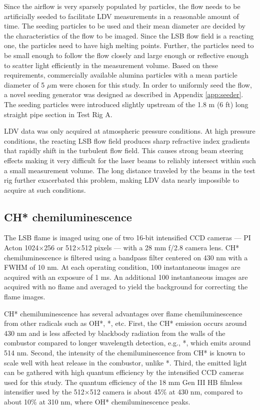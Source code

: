 Since the airflow is very sparsely populated by particles, the flow needs to be artificially seeded to facilitate LDV measurements in a reasonable amount of time.
The seeding particles to be used and their mean diameter are decided by the characteristics of the flow to be imaged.\cite{1997-melling}
Since the LSB flow field is a reacting one, the particles need to have high melting points.
Further, the particles need to be small enough to follow the flow closely and large enough or reflective enough to scatter light efficiently in the measurement volume.
Based on these requirements, commercially available alumina particles with a mean particle diameter of 5 \(\mu\)m were chosen for this study.
In order to uniformly seed the flow, a novel seeding generator was designed as described in Appendix \ref{app:seeder}.
The seeding particles were introduced slightly upstream of the 1.8 m (6 ft) long straight pipe section in Test Rig A.

LDV data was only acquired at atmospheric pressure conditions.
At high pressure conditions, the reacting LSB flow field produces sharp refractive index gradients that rapidly shift in the turbulent flow field.
This causes strong beam steering effects making it very difficult for the laser beams to reliably intersect within such a small measurement volume.
The long distance traveled by the beams in the test rig further exacerbated this problem, making LDV data nearly impossible to acquire at such conditions.

\subsection{CH* chemiluminescence}
\label{sec:chemiluminescence}

The LSB flame is imaged using one of two 16-bit intensified CCD cameras --- PI Acton 1024\(\times\)256 or 512\(\times\)512 pixels --- with a 28 mm f/2.8 camera lens.
CH* chemiluminescence is filtered using a bandpass filter centered on 430 nm with a FWHM of 10 nm.
At each operating condition, 100 instantaneous images are acquired with an exposure of 1 ms.
An additional 100 instantaneous images are acquired with no flame and averaged to yield the background for correcting the flame images.

CH* chemiluminescence has several advantages over flame chemiluminescence from other radicals such as OH*, *, etc.
First, the CH* emission occurs around 430 nm and is less affected by blackbody radiation from the walls of the combustor compared to longer wavelength detection, e.g., *, which emits around 514 nm.
Second, the intensity of the chemiluminescence from CH* is known to scale well with heat release in the combustor\cite{2006-hardalupas}, unlike *.
Third, the emitted light can be gathered with high quantum efficiency by the intensified CCD cameras used for this study.
The quantum efficiency of the 18 mm Gen III HB filmless intensifier used by the 512\(\times\)512 camera is about 45\% at 430 nm, compared to about 10\% at 310 nm, where OH* chemiluminescence peaks.

